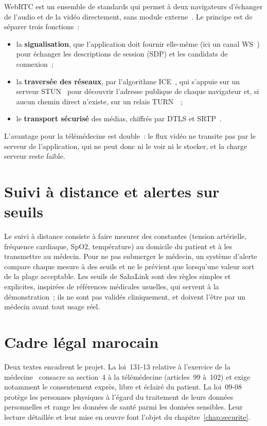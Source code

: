 WebRTC est un ensemble de standards qui permet à deux navigateurs d'échanger de l'audio et de la vidéo directement, sans module externe~\cite{w3cwebrtc,rfc8825}. Le principe est de séparer trois fonctions~:

\begin{itemize}
  \item la \textbf{signalisation}, que l'application doit fournir elle-même (ici un canal \ac{WS}~\cite{rfc6455}) pour échanger les descriptions de session (\ac{SDP}) et les candidats de connexion~;
  \item la \textbf{traversée des réseaux}, par l'algorithme \ac{ICE}~\cite{rfc8445}, qui s'appuie sur un serveur \ac{STUN}~\cite{rfc8489} pour découvrir l'adresse publique de chaque navigateur et, si aucun chemin direct n'existe, sur un relais \ac{TURN}~\cite{rfc8656}~;
  \item le \textbf{transport sécurisé} des médias, chiffrés par \ac{DTLS} et \ac{SRTP}~\cite{rfc5764}.
\end{itemize}

L'avantage pour la télémédecine est double~: le flux vidéo ne transite pas par le serveur de l'application, qui ne peut donc ni le voir ni le stocker, et la charge serveur reste faible.

\section{Suivi à distance et alertes sur seuils}

Le suivi à distance consiste à faire mesurer des constantes (tension artérielle, fréquence cardiaque, \ac{SpO2}, température) au domicile du patient et à les transmettre au médecin. Pour ne pas submerger le médecin, un système d'alerte compare chaque mesure à des seuils et ne le prévient que lorsqu'une valeur sort de la plage acceptable. Les seuils de SahaLink sont des règles simples et explicites, inspirées de références médicales usuelles, qui servent à la démonstration~; ils ne sont pas validés cliniquement, et doivent l'être par un médecin avant tout usage réel.

\section{Cadre légal marocain}

Deux textes encadrent le projet. La loi~131-13 relative à l'exercice de la médecine~\cite{loi13113} consacre sa section~4 à la télémédecine (articles~99 à~102) et exige notamment le consentement exprès, libre et éclairé du patient. La loi~09-08~\cite{loi0908} protège les personnes physiques à l'égard du traitement de leurs données personnelles et range les données de santé parmi les données sensibles. Leur lecture détaillée et leur mise en œuvre font l'objet du chapitre~\ref{chap:securite}.

